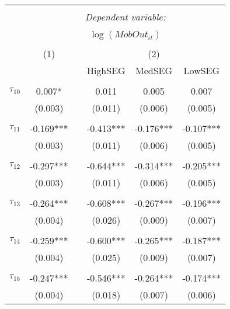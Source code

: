 \begin{tabular}{@{\extracolsep{-5pt}}lccccc} 
\\[-1.8ex]\hline 
\hline \\[-1.8ex] 
 & \multicolumn{5}{c}{\textit{Dependent variable:}} \\ 
\cline{2-6} 
\\[-1.8ex] & \multicolumn{5}{c}{$\log(MobOut_{it})$}\\ 
\\[-1.8ex] & (1) && \multicolumn{3}{c}{(2)} \\ 
\cline{2-2}\cline{4-6}
        &&& HighSEG & MedSEG & LowSEG  \\
 \\[-1.8ex] 
$\tau_{10}$     &  0.007*   &&   0.011   &   0.005   &   0.007   \\
                &  (0.003)  &&  (0.011)  &  (0.006)  &  (0.005)  \\
                &           &&           &           &           \\[-2.1ex]
$\tau_{11}$     & -0.169*** && -0.413*** & -0.176*** & -0.107*** \\
                &  (0.003)  &&  (0.011)  &  (0.006)  &  (0.005)  \\
                &           &&           &           &           \\[-2.1ex]
$\tau_{12}$     & -0.297*** && -0.644*** & -0.314*** & -0.205*** \\
                &  (0.003)  &&  (0.011)  &  (0.006)  &  (0.005)  \\
                &           &&           &           &           \\[-2.1ex]
$\tau_{13}$     & -0.264*** && -0.608*** & -0.267*** & -0.196*** \\
                &  (0.004)  &&  (0.026)  &  (0.009)  &  (0.007)  \\
                &           &&           &           &           \\[-2.1ex]
$\tau_{14}$     & -0.259*** && -0.600*** & -0.265*** & -0.187*** \\
                &  (0.004)  &&  (0.025)  &  (0.009)  &  (0.007)  \\
                &           &&           &           &           \\[-2.1ex]
$\tau_{15}$     & -0.247*** && -0.546*** & -0.264*** & -0.174*** \\
                &  (0.004)  &&  (0.018)  &  (0.007)  &  (0.006)  \\

\end{tabular}
